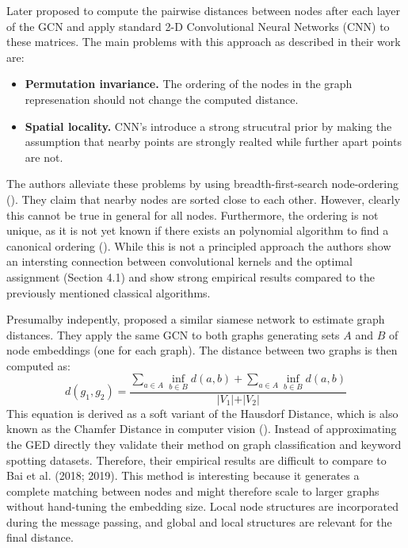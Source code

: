 
Later \cite{bai2018_cnn1} proposed to compute the pairwise distances between nodes after each layer of the GCN and apply standard 2-D Convolutional Neural Networks (CNN) to these matrices. The main problems with this approach as described in their work are:
\begin{itemize}
     \item \textbf{Permutation invariance.} The ordering of the nodes in the graph represenation should not change the computed distance.
     \item \textbf{Spatial locality.} CNN's introduce a strong strucutral prior by making the assumption that nearby points are strongly realted while further apart points are not.
\end{itemize}
The authors alleviate these problems by using breadth-first-search node-ordering (\citealp{bfs2018}). They claim that nearby nodes are sorted close to each other. However, clearly this cannot be true in general for all nodes. Furthermore, the ordering is not unique, as it is not yet known if there exists an polynomial algorithm to find a canonical ordering (\citealp{canonical2016}). While this is not a principled approach the authors show an intersting connection between convolutional kernels and the optimal assignment (Section 4.1) and show strong empirical results compared to the previously mentioned classical algorithms.

Presumalby indepently, \cite{riba2018} proposed a similar siamese network to estimate graph distances.  They apply the same GCN to both graphs generating sets $A$ and $B$ of node embeddings (one for each graph). The distance between two graphs is then computed as:
\begin{equation}
     d(g_{1}, g_{2}) = \frac{\sum_{a \in A} \inf_{b \in B} d(a, b) + \sum_{a \in A} \inf_{b \in B} d(a, b)}{\vert V_1 \vert + \vert V_2 \vert}
\end{equation}
This equation is derived as a soft variant of the Hausdorf Distance, which is also known as the Chamfer Distance in computer vision (\citealp{chamfer1977}). Instead of approximating the GED directly they validate their method on graph classification and keyword spotting datasets. Therefore, their empirical results are difficult to compare to Bai et al. (2018; 2019). This method is interesting because it generates a complete matching between nodes and might therefore scale to larger graphs without hand-tuning the embedding size. Local node structures are incorporated during the message passing, and global and local structures are relevant for the final distance.

